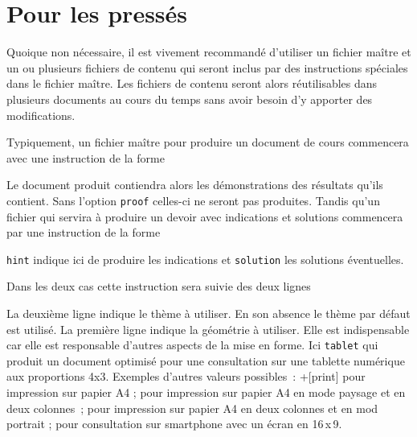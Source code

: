 \documentclass[11pt,report,oneside,solution]{cpgedev}
\begin{document}
\section{Pour les pressés}

Quoique non nécessaire, il est vivement recommandé d'utiliser un fichier maître et un ou plusieurs fichiers de contenu qui seront inclus par des instructions spéciales dans le fichier maître. Les fichiers de contenu seront alors réutilisables dans plusieurs documents au cours du temps sans avoir besoin d'y apporter des modifications.   

Typiquement, un fichier maître pour produire un document de cours commencera avec une instruction de la forme
Le document produit contiendra alors les démonstrations des résultats qu'ils contient. Sans l'option \verb+proof+ celles-ci ne seront pas produites. 
Tandis qu'un fichier qui servira à produire un devoir avec indications et solutions commencera par une instruction de la forme 
\verb+hint+ indique ici de produire les indications et \verb+solution+ les solutions éventuelles. 

Dans les deux cas cette instruction sera suivie des deux lignes 
\begin{latex}[]
\end{latex}
La deuxième ligne indique le thème à utiliser. En son absence le thème par défaut est utilisé. 
La première ligne indique la géométrie à utiliser. Elle est indispensable car elle est responsable d'autres aspects de la mise en forme. Ici \verb+tablet+ qui produit un document optimisé pour une consultation sur une tablette numérique aux proportions 4x3. Exemples d'autres valeurs possibles~:
\xopt+[print] 
pour  impression sur papier A4 ;
\xopt[lsprint] pour impression sur papier A4 en mode paysage et en deux colonnes~;
\xopt[2print] pour impression sur papier A4 en deux colonnes et en mod portrait ;
\xopt[phone] pour consultation sur smartphone avec un écran en 16\,x\,9. 
\exit
     
\end{document}
